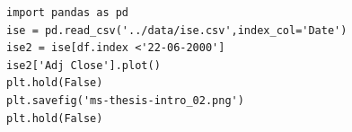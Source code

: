 \begin{figure}[ht]
\vspace{0.6cm}
\end{figure}

\begin{verbatim}
import pandas as pd
ise = pd.read_csv('../data/ise.csv',index_col='Date')
ise2 = ise[df.index <'22-06-2000']
ise2['Adj Close'].plot()
plt.hold(False)
plt.savefig('ms-thesis-intro_02.png')
plt.hold(False)
\end{verbatim}


\begin{figure}[ht]
\vspace{0.6cm}
\end{figure}

